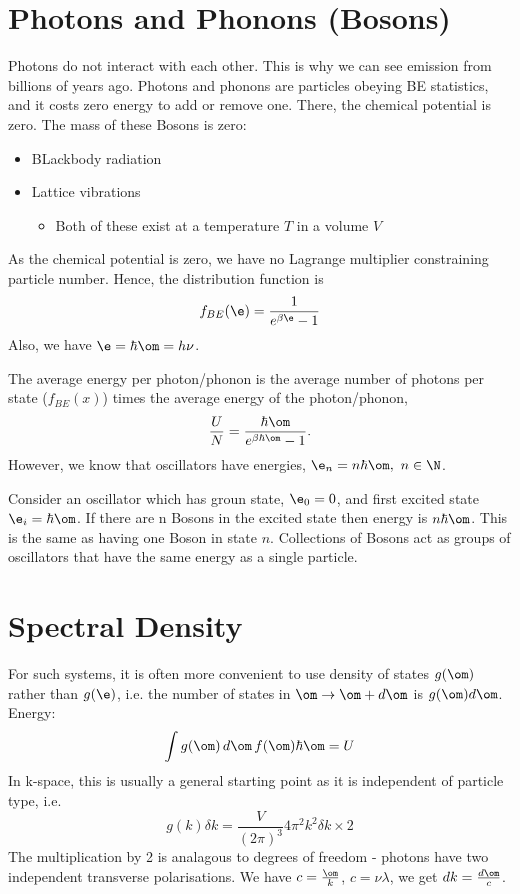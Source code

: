 \documentclass[a4paper, 11pt, normalem]{report}
\begin{document}
\section{Photons and Phonons (Bosons)}
Photons do not interact with each other. 
This is why we can see emission from billions of years ago. 
Photons and phonons are particles obeying BE statistics, and it costs zero energy to add or remove one. 
There, the chemical potential is zero. 
The mass of these Bosons is zero:
\begin{itemize}
    \item BLackbody radiation
    \item Lattice vibrations
        \begin{itemize}
            \item Both of these exist at a temperature $T$ in a volume $V$
        \end{itemize}
\end{itemize}
As the chemical potential is zero, we have no Lagrange multiplier constraining particle number. 
Hence, the distribution function is
\begin{equation}
    f_{BE}(\e) = \frac{1}{e^{\beta\e} - 1}
\end{equation}
Also, we have $\e = \hbar\om = h\nu$. 

The average energy per photon/phonon is the average number of photons per state ($f_{BE}(x)$) times the average energy of the photon/phonon,
\begin{equation}
    \frac{U}{N} = \frac{\hbar\om}{e^{\beta\hbar\om}-1}.
\end{equation}
However, we know that oscillators have energies, $\e_n = n\hbar\om,~ n \in \N$.

Consider an oscillator which has groun state, $\e_0 = 0$, and first excited state $\e_i = \hbar\om$.
If there are n Bosons in the excited state then energy is $n\hbar\om$.
This is the same as having one Boson in state $n$.
Collections of Bosons act as groups of oscillators that have the same energy as a single particle.

\section{Spectral Density}
For such systems, it is often more convenient to use density of states $g(\om)$ rather than $g(\e)$, i.e. the number of states in $\om \to \om+d\om$ is $g(\om)d\om$.
Energy:
\begin{equation}
    \int g(\om)\,d\om\, f(\om)\hbar\om = U
\end{equation}
In k-space, this is usually a general starting point as it is independent of particle type, i.e.
\begin{equation}
    g(k)\delta k = \frac{V}{(2\pi)^3}4\pi^2k^2\delta k \times 2
\end{equation}
The multiplication by 2 is analagous to degrees of freedom - photons have two independent transverse polarisations. 
We have $c = \frac{\om}{k}$, $c = \nu\lambda$, we get $dk = \frac{d\om}{c}$.
\end{document}
